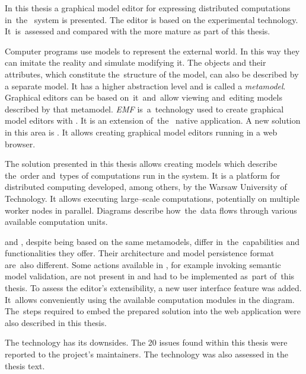 
{
In this thesis a graphical model editor for expressing distributed
computations in~the~\BalticLSC{} system is presented. The editor is based on
the experimental \SiriusWeb{} technology. It~is~assessed and
compared with the more mature \SiriusDesktop{} as part of this thesis.

Computer programs use models to represent the external world. In this way they
can imitate the reality and simulate modifying it. The objects and their
attributes, which constitute the~structure of the model, can also be described
by a separate model. It has a higher abstraction level and is called a
\emph{metamodel}.
Graphical editors can be based on~it~and~allow viewing and~editing models
described by that metamodel. \emph{\acrlong{EMF}} is~a~technology used to
create graphical model editors with \SiriusDesktop{}. It is an extension
of~the~\Eclipse{} native application. A new solution in this area is
\SiriusWeb{}. It
allows creating graphical model editors running in a web browser.

The solution presented in this thesis allows creating models which describe
the~order and~types of computations run in the \BalticLSC{} system. It is a
platform for distributed computing developed, among others, by the Warsaw
University of
Technology. It allows executing large--scale %
computations, potentially on multiple worker nodes in parallel.
Diagrams describe how~the~data flows through various available computation
units.

\SiriusDesktop{} and \SiriusWeb{}, despite being based on the same metamodels,
differ in~the~capabilities and functionalities they offer. Their architecture
and model persistence format are~also different. Some actions available in
\SiriusDesktop{}, for example invoking semantic model validation, are not
present in \SiriusWeb{} and had to be implemented as~part of~this thesis.
To assess the editor's extensibility, a new user interface feature was added.
It~allows conveniently using the available computation modules in the
diagram. The~steps required to embed the prepared solution into the
\BalticLSC{} web application were also described in this thesis.

The \SiriusWeb{} technology has its downsides. The 20 issues found within this
thesis were reported to the project's maintainers. The technology was also
assessed in the thesis text.
}
